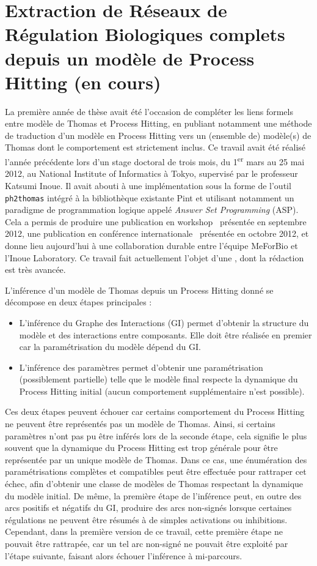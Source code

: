 \section{Extraction de Réseaux de Régulation Biologiques complets depuis un modèle de Process Hitting \normalsize(en cours)}
\label{sec:tcs}

La première année de thèse avait été l'occasion de compléter les liens formels entre modèle de Thomas et Process Hitting,
en publiant notamment une méthode de traduction d'un modèle en Process Hitting vers un (ensemble de) modèle(s) de Thomas dont le comportement est strictement inclus.
Ce travail avait été réalisé l'année précédente lors d'un stage doctoral de trois mois, du 1\textsuperscript{er} mars au 25 mai 2012, au National Institute of Informatics à Tokyo, supervisé par le professeur Katsumi Inoue.
Il avait abouti à une implémentation sous la forme de l'outil \texttt{ph2thomas} intégré à la bibliothèque existante Pint et utilisant notamment un paradigme de programmation logique appelé \emph{Answer Set Programming} (ASP).
Cela a permis de produire une publication en workshop~\cite{FPIMR12-LDSSB} présentée en septembre 2012, une publication en conférence internationale~\cite{FPIMR12-CMSB} présentée en octobre 2012, et donne lieu aujourd'hui à une collaboration durable entre l'équipe MeForBio et l'Inoue Laboratory.
Ce travail fait actuellement l'objet d'une , dont la rédaction est très avancée.

L'inférence d'un modèle de Thomas depuis un Process Hitting donné se décompose en deux étapes principales :
\begin{itemize}
  \item L'inférence du Graphe des Interactions (GI) permet d'obtenir la structure du modèle et des interactions entre composants.
  Elle doit être réalisée en premier car la paramétrisation du modèle dépend du GI.
  \item L'inférence des paramètres permet d'obtenir une paramétrisation (possiblement partielle) telle que le modèle final respecte la dynamique du Process Hitting initial (aucun comportement supplémentaire n'est possible).
\end{itemize}
Ces deux étapes peuvent échouer car certains comportement du Process Hitting ne peuvent être représentés pas un modèle de Thomas.
Ainsi, si certains paramètres n'ont pas pu être inférés lors de la seconde étape, cela signifie le plus souvent que la dynamique du Process Hitting est trop générale pour être représentée par un unique modèle de Thomas.
Dans ce cas, une énumération des paramétrisations complètes et compatibles peut être effectuée pour rattraper cet échec, afin d'obtenir une classe de modèles de Thomas respectant la dynamique du modèle initial.
De même, la première étape de l'inférence peut, en outre des arcs positifs et négatifs du GI, produire des arcs non-signés lorsque certaines régulations ne peuvent être résumés à de simples activations ou inhibitions.
Cependant, dans la première version de ce travail, cette première étape ne pouvait être rattrapée,
car un tel arc non-signé ne pouvait être exploité par l'étape suivante, faisant alors échouer l'inférence à mi-parcours.

